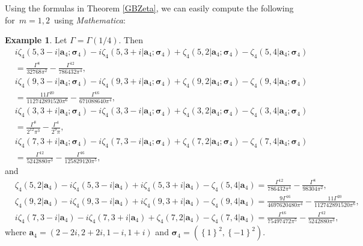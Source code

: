 \documentclass[11pt]{article}
\theoremstyle{plain}
\theoremstyle{definition}
\newtheorem{exa}[thm]{Example}
\begin{document}
Using the formulas in Theorem \ref{GBZeta}, we can easily compute the following for \(m = 1, 2\) using \emph{Mathematica}:
\begin{exa}
	Let $\Gamma=\Gamma(1/4)$. Then
\begin{align*}
	&i\zeta _4\left( 5,3-i|\mathbf{a}_4;\boldsymbol{\sigma }_4 \right) -i\zeta _4\left( 5,3+i|\mathbf{a}_4;\boldsymbol{\sigma }_4 \right) 	+\zeta _4\left( 5,2|\mathbf{a}_4;\boldsymbol{\sigma }_4 \right) -\zeta _4\left( 5,4|\mathbf{a}_4;\boldsymbol{\sigma }_4 \right)\\& =
	\frac{\Gamma ^8}{32768\pi ^2}-\frac{\Gamma ^{12}}{786432\pi ^4},
\\
	&i\zeta _4\left( 9,3-i|\mathbf{a}_4;\boldsymbol{\sigma }_4 \right)-i\zeta _4\left( 9,3+i|\mathbf{a}_4;\boldsymbol{\sigma }_4 \right) 	+\zeta _4\left( 9,2|\mathbf{a}_4;\boldsymbol{\sigma }_4 \right) -\zeta _4\left( 9,4|\mathbf{a}_4;\boldsymbol{\sigma }_4 \right) \\&=
\frac{11\Gamma ^{20}}{112742891520\pi ^6}-\frac{\Gamma ^{16}}{671088640\pi ^4},
	\\&
	i\zeta _4\left( 3,3+i|\mathbf{a}_4;\boldsymbol{\sigma }_4 \right)-i\zeta _4\left( 3,3-i|\mathbf{a}_4;\boldsymbol{\sigma }_4 \right) 
	+\zeta _4\left( 3,2|\mathbf{a}_4;\boldsymbol{\sigma }_4 \right) -\zeta _4\left( 3,4|\mathbf{a}_4;\boldsymbol{\sigma }_4 \right)\\& =\frac{\Gamma ^8}{2^{12}\pi ^3}-\frac{\Gamma ^4}{2^9\pi},
	\\
&	i\zeta _4\left( 7,3+i|\mathbf{a}_4;\boldsymbol{\sigma }_4 \right)-i\zeta _4\left( 7,3-i|\mathbf{a}_4;\boldsymbol{\sigma }_4 \right) 
	+\zeta _4\left( 7,2|\mathbf{a}_4;\boldsymbol{\sigma }_4 \right) -\zeta _4\left( 7,4|\mathbf{a}_4;\boldsymbol{\sigma }_4 \right)\\& =\frac{\Gamma ^{12}}{5242880\pi ^3}-\frac{\Gamma ^{16}}{125829120\pi ^5},
\end{align*}
and
\begin{align*}
&	\zeta _4(5,2|\mathbf{a}_4)-i\zeta _4(5,3-i|\mathbf{a}_4)+i\zeta _4(5,3+i|\mathbf{a}_4)-\zeta _4(5,4|\mathbf{a}_4)
	=\frac{\Gamma ^{12}}{786432\pi ^4}-\frac{\Gamma ^8}{98304\pi ^2},
	\\
&	\zeta _4(9,2|\mathbf{a}_4)-i\zeta _4(9,3-i|\mathbf{a}_4)+i\zeta _4(9,3+i|\mathbf{a}_4)-\zeta _4(9,4|\mathbf{a}_4)
	=\frac{9\Gamma ^{16}}{4697620480\pi ^4}-\frac{11\Gamma ^{20}}{
		112742891520\pi ^6},
	\\
&i\zeta _4(7,3-i|\mathbf{a}_4)-i	\zeta _4(7,3+i|\mathbf{a}_4)+\zeta _4(7,2|\mathbf{a}_4)-\zeta _4(7,4|\mathbf{a}_4)
	=\frac{\Gamma ^{16}}{75497472\pi ^5}-\frac{\Gamma ^{12}}{5242880\pi ^3},
\end{align*}
where $\mathbf{a}_4=\left( 2-2i,2+2i,1-i,1+i \right) $ and $\boldsymbol{\sigma }_4=\left( \left\{ 1 \right\}^2,\left\{ -1 \right\}^2 \right)$.
	\end{exa}
\end{document}

